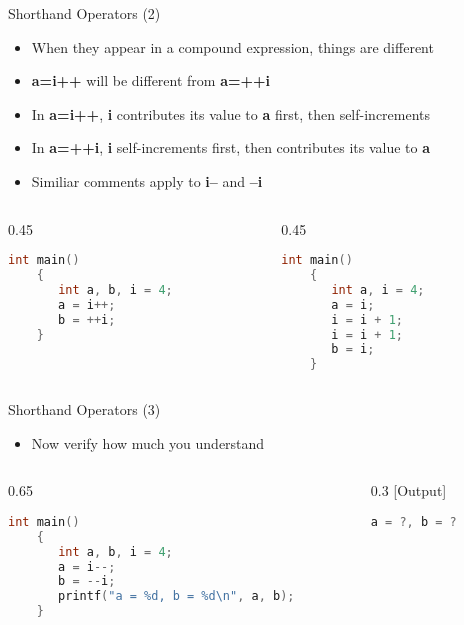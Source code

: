 \begin{frame}[fragile]{Shorthand Operators (2)}
\begin{itemize}
	\item {When they appear in a compound expression, things are different}
	\item {\textbf{a=i++} will be different from \textbf{a=++i}}
	\item {In \textbf{a=i++}, \textbf{i} contributes its value to \textbf{a} first, then self-increments}
	\item {In \textbf{a=++i}, \textbf{i} self-increments first, then contributes its value to \textbf{a}}
	\item {Similiar comments apply to \textbf{i--} and \textbf{--i}}
\end{itemize}
\begin{columns}
\begin{column}{0.45\linewidth}
	\begin{lstlisting}[numbers=none, language=c, rulecolor=\color{blue}]
	int main()
	{
	   int a, b, i = 4;
	   a = i++;
	   b = ++i;
	}
	\end{lstlisting}
\end{column}
\begin{column}{0.45\linewidth}
	\begin{lstlisting}[numbers=none, language=c, rulecolor=\color{blue}]
	int main()
	{
	   int a, i = 4;
	   a = i;
	   i = i + 1;
	   i = i + 1;
	   b = i;
	}
	\end{lstlisting}
\end{column}
\end{columns}
\end{frame}

\begin{frame}[fragile]{Shorthand Operators (3)}
\begin{itemize}
	\item {Now verify how much you understand}
\end{itemize}
\begin{columns}
\begin{column}{0.65\linewidth}
	\begin{lstlisting}[numbers=none, language=c, rulecolor=\color{blue}]
	int main()
	{
	   int a, b, i = 4;
	   a = i--;
	   b = --i;
	   printf("a = %d, b = %d\n", a, b);
	}
	\end{lstlisting}
\end{column}
\begin{column}{0.3\linewidth}
[Output]
	\begin{lstlisting}[numbers=none, language=c, rulecolor=\color{blue}]
	a = ?, b = ?
	\end{lstlisting}
\end{column}
\end{columns}
\end{frame}

